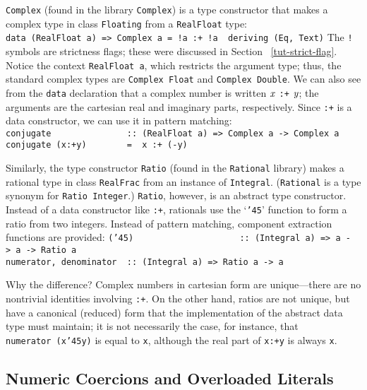 \mbox{\tt Complex} (found in the library \mbox{\tt Complex}) is a type constructor that
makes a complex type in class  \mbox{\tt Floating} from a \mbox{\tt RealFloat} type:
\bprog
\mbox{\tt data\ (RealFloat\ a)\ =>\ Complex\ a\ =\ !a\ :+\ !a\ \ deriving\ (Eq,\ Text)}
\eprog
The \mbox{\tt !} symbols are strictness flags; these were discussed in Section~
\ref{tut-strict-flag}.
Notice the context \mbox{\tt RealFloat\ a}, which restricts the argument
type; thus, the standard complex types are \mbox{\tt Complex\ Float} and
\mbox{\tt Complex\ Double}.  We can also see from the \mbox{\tt data} declaration
that a complex number is written \mbox{$\it x$} \mbox{\tt :+} \mbox{$\it y$}; the arguments are
the cartesian real and imaginary parts, respectively.  Since \mbox{\tt :+}
is a data constructor, we can use it in pattern matching:
\bprog
\mbox{\tt conjugate\ \ \ \ \ \ \ \ \ \ \ \ \ \ \ ::\ (RealFloat\ a)\ =>\ Complex\ a\ ->\ Complex\ a}\\
\mbox{\tt conjugate\ (x:+y)\ \ \ \ \ \ \ \ =\ \ x\ :+\ (-y)}
\eprog

Similarly, the type constructor \mbox{\tt Ratio} (found in the \mbox{\tt Rational}
library) makes a rational type in class \mbox{\tt RealFrac} from an instance of
\mbox{\tt Integral}. 
(\mbox{\tt Rational} is a type synonym for \mbox{\tt Ratio\ Integer}.)
\mbox{\tt Ratio}, however, is an abstract type constructor. 
Instead of a data constructor like \mbox{\tt :+}, rationals use the `\mbox{\tt {\char'45}}' function to
form a ratio from two integers.  Instead of pattern matching,
component extraction functions are provided:
\bprog
\mbox{\tt ({\char'45})\ \ \ \ \ \ \ \ \ \ \ \ \ \ \ \ \ \ \ \ \ ::\ (Integral\ a)\ =>\ a\ ->\ a\ ->\ Ratio\ a}\\
\mbox{\tt numerator,\ denominator\ \ ::\ (Integral\ a)\ =>\ Ratio\ a\ ->\ a}
\eprog

Why the difference?  Complex numbers in cartesian form are
unique---there are no nontrivial identities involving \mbox{\tt :+}.  On the
other hand, ratios are not unique, but have a canonical (reduced) form
that the implementation of the abstract data type must maintain; it is
not necessarily the case, for instance, that \mbox{\tt numerator\ (x{\char'45}y)} is
equal to \mbox{\tt x}, although the real part of \mbox{\tt x:+y} is always \mbox{\tt x}.

\subsection{Numeric Coercions and Overloaded Literals}
\label{tut-num-constants}

